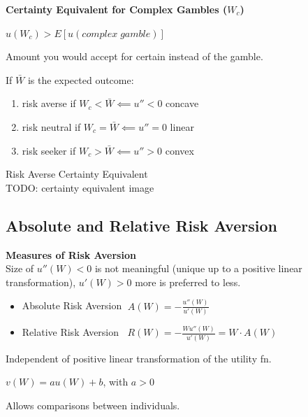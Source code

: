 \documentclass[
14pt,notheorems,hyperref={pdfauthor=whatever}
]{beamer}
\begin{document}
\begin{frame}
\textbf{Certainty Equivalent for Complex Gambles ($W_c$)}\\
\begin{center}
    $u(W_c) > E[u(complex\;gamble)]$\\
\end{center}
\begin{center}
    Amount you would accept for certain instead of the gamble.
\end{center}
\hfill \break
If $\bar{W}$ is the expected outcome:\\
\begin{enumerate}
\setlength{\itemindent}{.5in}
    \item risk averse if $W_c < \bar{W} \impliedby u''<0$  concave
    \item risk neutral if $W_c = \bar{W} \impliedby u''=0$  linear
    \item risk seeker if $W_c > \bar{W} \impliedby u''>0$  convex
\end{enumerate}
\end{frame}

\begin{frame}
Risk Averse Certainty Equivalent\\
TODO: certainty equivalent image
\end{frame}

\subsection{Absolute and Relative Risk Aversion}

\begin{frame}
\textbf{Measures of Risk Aversion}\\
\hfill \break
Size of  $u''(W)<0$  is not meaningful (unique up to a positive linear transformation),  $u'(W)>0$ more is preferred to less.\\
\begin{itemize}
    \item Absolute Risk Aversion $\;A(W) = -\frac{u''(W)}{u'(W)}$\\
    \item Relative Risk Aversion $\;\;R(W) = -\frac{Wu''(W)}{u'(W)} = W\cdot A(W)$\\
\end{itemize}
\hfill \break
Independent of positive linear transformation of the utility fn.
\begin{center}
    $v(W)=au(W)+b$, with $a>0$\\
\end{center}
Allows comparisons between individuals.\\
\end{frame}
\end{document}
